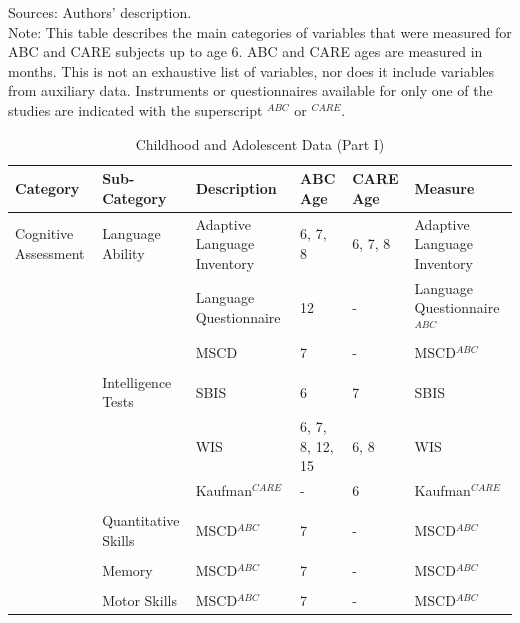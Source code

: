\documentclass[static]{JJH-Beamer}
\begin{document}
{\flushleft \normalsize Sources: Authors' description. \\	
Note: This table describes the main categories of variables that were measured for ABC and CARE subjects up to age 6. ABC and CARE ages are measured in months. This is not an exhaustive list of variables, nor does it include variables from auxiliary data.  Instruments or questionnaires available for only one of the studies are indicated with the superscript $^{ABC}$ or $^{CARE}$.\\}
\clearpage

\begin{frame}

\begin{table}[H]
\caption{Childhood and Adolescent Data (Part I)} \label{tab:youthvars_1}
\begin{center}
\begin{tiny}
\begin{tabular}{L{1.2cm} C{1.4cm} C{2.3cm} C{1cm} C{1cm} C{2.7cm}}
\toprule
\textbf{Category}	&	\textbf{Sub-Category}	&	\textbf{Description}	&	\textbf{ABC Age}  	&  \textbf{CARE Age}  & 	\textbf{Measure}	\\ \midrule
Cognitive Assessment	&	Language Ability	&	Adaptive Language Inventory	&	6, 7, 8	&	6, 7, 8	&	Adaptive Language Inventory	\\
	&		&	Language Questionnaire	&	12	&	- 	&	Language Questionnaire$^{ABC}$	\\
	&		&	MSCD 	&	7	&	- 	&	MSCD$^{ABC}$	\\
	&	\\
	&	Intelligence Tests	&	SBIS	 &	6	&	7	&	SBIS	\\
	&		&	 WIS	&	6, 7, 8, 12, 15	&	6, 8	&	WIS	\\
	&		& Kaufman$^{CARE}$ & 	-	& 6 & Kaufman$^{CARE}$ \\
	&	\\
	&	Quantitative Skills	&	MSCD$^{ABC}$ 	&	7	&	-	&	MSCD$^{ABC}$ 	\\
	&	\\
	&	Memory	&	MSCD$^{ABC}$ 	&	7	&	-	&	MSCD$^{ABC}$	\\
	&	\\
	&	Motor Skills	&	MSCD$^{ABC}$ 	&	7	&	-	&	MSCD$^{ABC}$	\\
\bottomrule
\end{tabular}
\end{tiny}
\end{center}
\end{table}

\end{frame}
\end{document}
